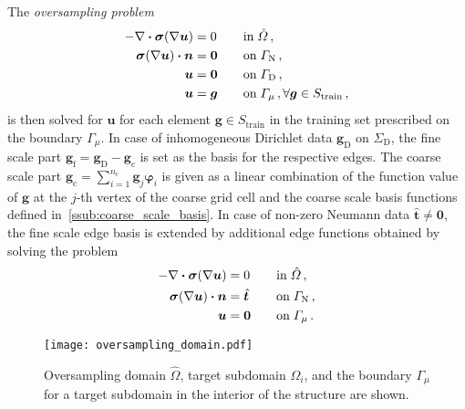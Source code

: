 \documentclass[AMA,STIX1COL,doublespace]{WileyNJD-v2}
\begin{document}
The \textit{oversampling problem}
\begin{equation}
	\label{eq:oversampling_problem}
    \begin{aligned}
        - \nabla\vdot\bm{\sigma}(\nabla\bm{u}) &= 0 \quad &&\mathrm{in}\;\hat{\varOmega}_{}\,,\\
        \bm{\sigma}(\nabla\bm{u})\vdot\bm{n} &= \bm{0} \quad &&\mathrm{on}\; \varGamma_{\mathrm{N}}\,,\\
        \bm{u} &= \bm{0} \quad &&\mathrm{on}\;\varGamma_{\mathrm{D}}\,,\\
	    \bm{u} &= \bm{g} \quad &&\mathrm{on}\;\varGamma_{\mu}\,,\forall \bm{g}\in S_{\mathrm{train}}\,,
    \end{aligned}
\end{equation}
is then solved for $\bm{u}$ for each element $\bm{g}\in S_{\mathrm{train}}$ in the training set prescribed on the boundary $\varGamma_{\mu}$.
In case of inhomogeneous Dirichlet data $\bm{g}_{\mathrm{D}}$ on $\varSigma_{\mathrm{D}}$, the fine scale part $\bm{g}_{\mathrm{f}} = \bm{g}_{\mathrm{D}} - \bm{g}_{\mathrm{c}}$ is set as the basis for the respective edges.
The coarse scale part
$\bm{g}_{\mathrm{c}}= \sum_{i=1}^{n_{\mathrm{c}}}\bm{g}_j \bm\varphi_i$
is given as a linear combination of the function value of $\bm{g}$ at the
$j$-th vertex of the coarse grid cell and the coarse scale basis functions
defined in~\cref{ssub:coarse_scale_basis}.
In case of non-zero Neumann data $\hat{\bm{t}}\ne \bm{0}$,
the fine scale edge basis is extended by
additional edge functions obtained by solving the problem
\begin{equation}
	\label{eq:oversampling_problem_neumann}
	\begin{aligned}
		- \nabla\vdot\bm{\sigma}(\nabla\bm{u}) &= 0 \quad &&\mathrm{in}\;\hat{\varOmega}_{}\,,\\
		\bm{\sigma}(\nabla\bm{u})\vdot\bm{n} &= \hat{\bm{t}} \quad &&\mathrm{on}\; \varGamma_{\mathrm{N}}\,,\\
		\bm{u} &= \bm{0} \quad &&\mathrm{on}\;\varGamma_{\mu}\,.
	\end{aligned}
\end{equation}

\begin{figure}[tb]
\begin{center}
	\texttt{[image: oversampling\_domain.pdf]}
\end{center}
\caption{Oversampling domain $\hat{\varOmega}$, target subdomain $\varOmega_i$, and the boundary $\varGamma_{\mu}$ for a target subdomain in the interior of the structure are shown.}%
\label{fig:oversampling}
\end{figure}
\end{document}
